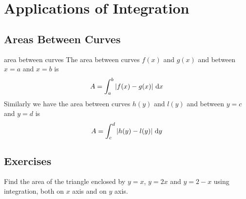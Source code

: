 \documentclass[Calculus 1 Recitation.tex]{subfiles}
\begin{document}
\section{Applications of Integration}
\subsection{Areas Between Curves}

\begin{myleftlinebox}
	area between curves
	\tcblower
	The area between curves $f(x)$ and $g(x)$ and between $x=a$ and $x=b$ is 
	\[A=\int_a^b \left\vert f(x)-g(x)\right\vert\,\mathrm{d} x\]
	Similarly we have the area between curves $h(y)$ and $l(y)$ and between $y=c$ and $y=d$ is
	\[A = \int_c^d \left\vert h(y)-l(y)\right\vert\,\mathrm{d} y\]
\end{myleftlinebox}

\subsection{Exercises}
\begin{myleftlinebox}
	Find the area of the triangle enclosed by $y=x$, $y=2x$ and $y=2-x$ using integration, both on $x$ axis and on $y$ axis.
	\tcblower
	\vspace{2em}
\end{myleftlinebox}
\end{document}
